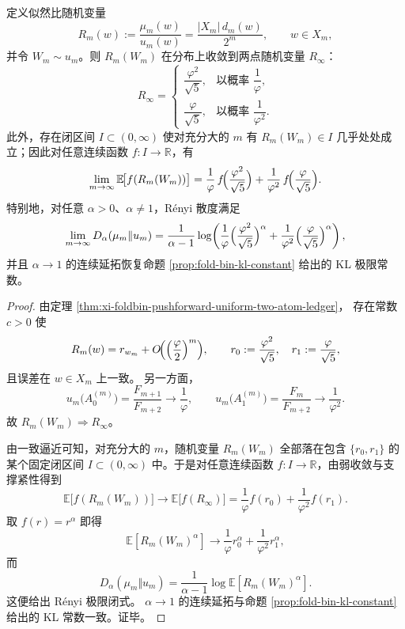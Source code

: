 \begin{theorem}[似然比随机变量的二点极限与泛函传递原则]\label{thm:conclusion-foldbin-likelihood-ratio-two-atom-transfer}
定义似然比随机变量
\[
R_m(w):=\frac{\mu_m(w)}{u_m(w)}=\frac{|X_m|\,d_m(w)}{2^m},
\qquad
w\in X_m,
\]
并令 \(W_m\sim u_m\)。则 \(R_m(W_m)\) 在分布上收敛到两点随机变量 \(R_\infty\)：
\[
R_\infty=
\begin{cases}
\dfrac{\varphi^2}{\sqrt5}, & \text{以概率 }\dfrac{1}{\varphi},\\[10pt]
\dfrac{\varphi}{\sqrt5}, & \text{以概率 }\dfrac{1}{\varphi^2}.
\end{cases}
\]
此外，存在闭区间 \(I\subset(0,\infty)\) 使对充分大的 \(m\) 有 \(R_m(W_m)\in I\) 几乎处处成立；因此对任意连续函数 \(f:I\to\mathbb R\)，有
\[
\lim_{m\to\infty}\mathbb E\!\bigl[f(R_m(W_m))\bigr]
=
\frac{1}{\varphi}\,f\!\Bigl(\frac{\varphi^2}{\sqrt5}\Bigr)
+
\frac{1}{\varphi^2}\,f\!\Bigl(\frac{\varphi}{\sqrt5}\Bigr).
\]
特别地，对任意 \(\alpha>0\)、\(\alpha\neq 1\)，Rényi 散度满足
\[
\lim_{m\to\infty}D_\alpha(\mu_m\Vert u_m)
=
\frac{1}{\alpha-1}\log\!\left(
\frac{1}{\varphi}\Bigl(\frac{\varphi^2}{\sqrt5}\Bigr)^\alpha
+
\frac{1}{\varphi^2}\Bigl(\frac{\varphi}{\sqrt5}\Bigr)^\alpha
\right),
\]
并且 \(\alpha\to 1\) 的连续延拓恢复命题 \ref{prop:fold-bin-kl-constant} 给出的 KL 极限常数。
\end{theorem}
\begin{proof}
由定理 \ref{thm:xi-foldbin-pushforward-uniform-two-atom-ledger}，
存在常数 \(c>0\) 使
\[
R_m(w)=r_{w_m}+O\!\Bigl(\Bigl(\frac{\varphi}{2}\Bigr)^m\Bigr),
\qquad
r_0:=\frac{\varphi^2}{\sqrt5},
\quad
r_1:=\frac{\varphi}{\sqrt5},
\]
且误差在 \(w\in X_m\) 上一致。
另一方面，
\[
u_m\bigl(A_0^{(m)}\bigr)=\frac{F_{m+1}}{F_{m+2}}\longrightarrow \frac{1}{\varphi},
\qquad
u_m\bigl(A_1^{(m)}\bigr)=\frac{F_m}{F_{m+2}}\longrightarrow \frac{1}{\varphi^2}.
\]
故 \(R_m(W_m)\Rightarrow R_\infty\)。

由一致逼近可知，对充分大的 \(m\)，随机变量 \(R_m(W_m)\) 全部落在包含 \(\{r_0,r_1\}\) 的某个固定闭区间 \(I\subset(0,\infty)\) 中。于是对任意连续函数 \(f:I\to\mathbb R\)，由弱收敛与支撑紧性得到
\[
\mathbb E\!\bigl[f(R_m(W_m))\bigr]
\longrightarrow
\mathbb E\!\bigl[f(R_\infty)\bigr]
=
\frac{1}{\varphi}f(r_0)+\frac{1}{\varphi^2}f(r_1).
\]
取 \(f(r)=r^\alpha\) 即得
\[
\mathbb E[R_m(W_m)^\alpha]
\longrightarrow
\frac{1}{\varphi}r_0^\alpha+\frac{1}{\varphi^2}r_1^\alpha,
\]
而
\[
D_\alpha(\mu_m\Vert u_m)=\frac{1}{\alpha-1}\log \mathbb E[R_m(W_m)^\alpha].
\]
这便给出 Rényi 极限闭式。
\(\alpha\to 1\) 的连续延拓与命题 \ref{prop:fold-bin-kl-constant} 给出的 KL 常数一致。证毕。
\end{proof}

